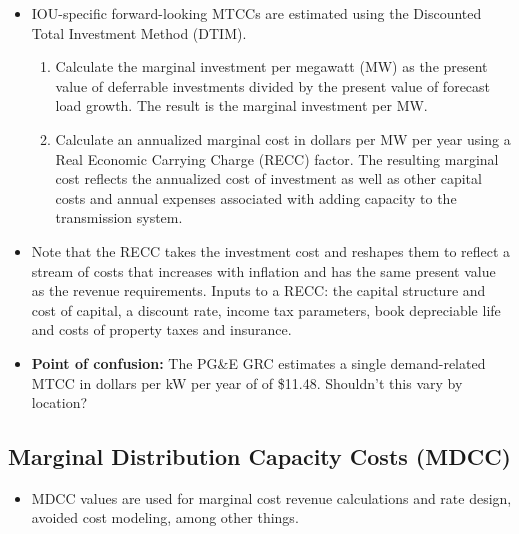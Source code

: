 \documentclass[11pt]{article}
\begin{document}
\begin{itemize}
\begin{itemize}

\item IOU-specific forward-looking MTCCs are estimated using the Discounted Total Investment Method (DTIM).

\begin{enumerate}

\item Calculate the marginal investment per megawatt (MW) as the present value of deferrable investments divided by the present value of forecast load growth. The result is the marginal investment per MW. 

\item Calculate an annualized marginal cost in dollars per MW per year using a Real Economic Carrying Charge (RECC) factor. The resulting marginal cost reflects the annualized cost of investment as well as other capital costs and annual expenses associated with adding capacity to the transmission system. 

\end{enumerate}


\item Note that the RECC takes the investment cost and reshapes them to reflect a stream of costs that increases with inflation and has the same present value as the revenue requirements. Inputs to a RECC: the capital structure and cost of capital, a discount rate, income tax parameters, book depreciable life and costs of
property taxes and insurance. 


\item \textbf{Point of confusion:} The PG&E GRC  estimates   a single demand-related  MTCC in dollars per kW per year of  of \$11.48.  Shouldn't this vary by location?  

\end{itemize}


\subsection{Marginal Distribution Capacity Costs (MDCC)}
\begin{itemize}

\item MDCC values are used for marginal cost revenue calculations and rate design, avoided cost modeling, among other things. 



\end{itemize}
\end{itemize}
\end{document}
